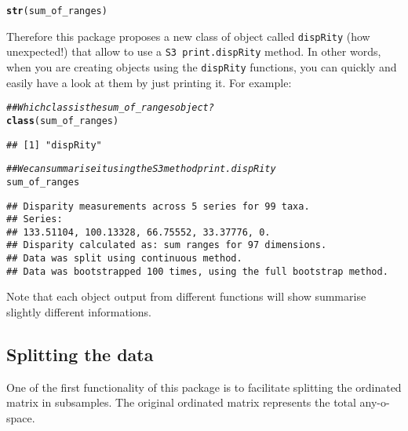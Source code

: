 \documentclass{article}\usepackage[]{graphicx}\usepackage[]{color}
\makeatletter
\newcommand{\hlcom}[1]{\textcolor[rgb]{0.678,0.584,0.686}{\textit{#1}}}%
\newcommand{\hlstd}[1]{\textcolor[rgb]{0.345,0.345,0.345}{#1}}%
\newcommand{\hlkwd}[1]{\textcolor[rgb]{0.737,0.353,0.396}{\textbf{#1}}}%
\newenvironment{kframe}{%
 \def\at@end@of@kframe{}%
 \ifinner\ifhmode%
  \def\at@end@of@kframe{\end{minipage}}%
  \begin{minipage}{\columnwidth}%
 \fi\fi%
 \def\FrameCommand##1{\hskip\@totalleftmargin \hskip-\fboxsep
 \colorbox{shadecolor}{##1}\hskip-\fboxsep
     \hskip-\linewidth \hskip-\@totalleftmargin \hskip\columnwidth}%
 \MakeFramed {\advance\hsize-\width
   \@totalleftmargin\z@ \linewidth\hsize
   \@setminipage}}%
 {\par\unskip\endMakeFramed%
 \at@end@of@kframe}
\newenvironment{knitrout}{}{} %
\newcommand{\dispRity}{\texttt{dispRity} }
\makeatother
\begin{document}
\begin{knitrout}
\color{fgcolor}\begin{kframe}
\begin{alltt}
\hlkwd{str}\hlstd{(sum_of_ranges)}
\end{alltt}
\end{kframe}
\end{knitrout}

Therefore this package proposes a new class of object called \dispRity (how unexpected!) that allow to use a \texttt{S3 print.dispRity} method.
In other words, when you are creating objects using the \dispRity functions, you can quickly and easily have a look at them by just printing it.
For example:

\begin{knitrout}
\color{fgcolor}\begin{kframe}
\begin{alltt}
\hlcom{## Which class is the sum_of_ranges object?}
\hlkwd{class}\hlstd{(sum_of_ranges)}
\end{alltt}
\begin{verbatim}
## [1] "dispRity"
\end{verbatim}
\begin{alltt}
\hlcom{## We can summarise it using the S3 method print.dispRity}
\hlstd{sum_of_ranges}
\end{alltt}
\begin{verbatim}
## Disparity measurements across 5 series for 99 taxa. 
## Series:
## 133.51104, 100.13328, 66.75552, 33.37776, 0.
## Disparity calculated as: sum ranges for 97 dimensions.
## Data was split using continuous method.
## Data was bootstrapped 100 times, using the full bootstrap method.
\end{verbatim}
\end{kframe}
\end{knitrout}

Note that each object output from different functions will show summarise slightly different informations.

\subsection{Splitting the data}
One of the first functionality of this package is to facilitate splitting the ordinated matrix in subsamples.
The original ordinated matrix represents the total any-o-space.
\end{document}
